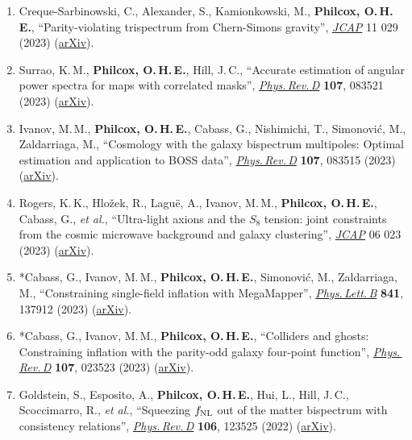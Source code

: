 \begin{enumerate}
    \item Creque-Sarbinowski, C., Alexander, S., Kamionkowski, M., \textbf{Philcox, O.\,H.\,E.}, ``Parity-violating trispectrum from Chern-Simons gravity'', \href{https://doi.org/10.1088/1475-7516/2023/11/029}{\textit{JCAP}} 11 029 (2023) (\href{https://arxiv.org/abs/2303.04815}{arXiv}).
    \item Surrao, K.\,M., \textbf{Philcox, O.\,H.\,E.}, Hill, J.\,C., ``Accurate estimation of angular power spectra for maps with correlated masks'', \href{https://doi.org/10.1103/PhysRevD.107.083521}{\textit{Phys.\,Rev.\,D}} \textbf{107}, 083521 (2023) (\href{https://arxiv.org/abs/2302.05436}{arXiv}).
    \item Ivanov, M.\,M., \textbf{Philcox, O.\,H.\,E.}, Cabass, G., Nishimichi, T., Simonovi\'c, M., Zaldarriaga, M., ``Cosmology with the galaxy bispectrum multipoles: Optimal estimation and application to BOSS data'', \href{https://doi.org/10.1103/PhysRevD.107.083515}{\textit{Phys.\,Rev.\,D}} \textbf{107}, 083515 (2023) (\href{https://arxiv.org/abs/2302.04414}{arXiv}).
    \item Rogers, K.\,K., Hlo\v{z}ek, R., Lagu\"e, A., Ivanov, M.\,M., \textbf{Philcox, O.\,H.\,E.}, Cabass, G., \textit{et al.}, ``Ultra-light axions and the $S_8$ tension: joint constraints from the cosmic microwave background and galaxy clustering'', \href{https://doi.org/10.1088/1475-7516/2023/06/023}{\textit{JCAP}} 06 023 (2023) (\href{https://arxiv.org/abs/2301.08361}{arXiv}).
    \item *Cabass, G., Ivanov, M.\,M., \textbf{Philcox, O.\,H.\,E.}, Simonovi\'c, M., Zaldarriaga, M., ``Constraining single-field inflation with MegaMapper'', \href{https://doi.org/10.1016/j.physletb.2023.137912}{\textit{Phys.\,Lett.\,B}} \textbf{841}, 137912 (2023) (\href{https://arxiv.org/abs/2211.14899}{arXiv}).
    \item *Cabass, G., Ivanov, M.\,M., \textbf{Philcox, O.\,H.\,E.}, ``Colliders and ghosts: Constraining inflation with the parity-odd galaxy four-point function'', \href{https://doi.org/10.1103/PhysRevD.107.023523}{\textit{Phys.\,Rev.\,D}} \textbf{107}, 023523 (2023) (\href{https://arxiv.org/abs/2210.16320}{arXiv}).
    \item Goldstein, S., Esposito, A., \textbf{Philcox, O.\,H.\,E.}, Hui, L., Hill, J.\,C., Scoccimarro, R., \textit{et al.}, ``Squeezing $f_{\rm NL}$ out of the matter bispectrum with consistency relations'', \href{https://doi.org/10.1103/PhysRevD.106.123525}{\textit{Phys.\,Rev.\,D}} \textbf{106}, 123525 (2022) (\href{https://arxiv.org/abs/2209.06228}{arXiv}).

\end{enumerate}
